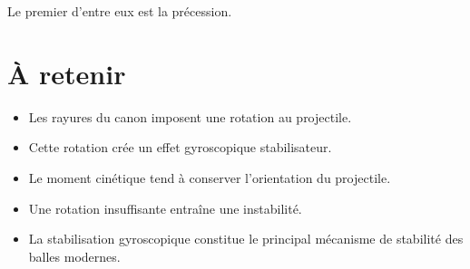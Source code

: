 Le premier d'entre eux est la précession.

\section{À retenir}

\begin{aretenir}

\begin{itemize}
    \item Les rayures du canon imposent une rotation au projectile.
    \item Cette rotation crée un effet gyroscopique stabilisateur.
    \item Le moment cinétique tend à conserver l'orientation du projectile.
    \item Une rotation insuffisante entraîne une instabilité.
    \item La stabilisation gyroscopique constitue le principal mécanisme de
          stabilité des balles modernes.
\end{itemize}

\end{aretenir}
